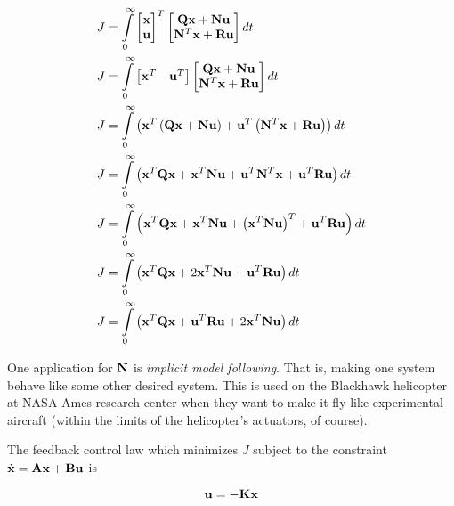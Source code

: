 \begin{align*}
  J &= \int\limits_0^\infty
    \begin{bmatrix}
      \mathbf{x} \\
      \mathbf{u}
    \end{bmatrix}^T
    \begin{bmatrix}
      \mathbf{Q}\mathbf{x} + \mathbf{N}\mathbf{u} \\
      \mathbf{N}^T\mathbf{x} + \mathbf{R}\mathbf{u}
    \end{bmatrix} dt \\
  J &= \int\limits_0^\infty
    \begin{bmatrix}
      \mathbf{x}^T & \mathbf{u}^T
    \end{bmatrix}
    \begin{bmatrix}
      \mathbf{Q}\mathbf{x} + \mathbf{N}\mathbf{u} \\
      \mathbf{N}^T\mathbf{x} + \mathbf{R}\mathbf{u}
    \end{bmatrix} dt \\
  J &= \int\limits_0^\infty
    \left(\mathbf{x}^T\left(\mathbf{Q}\mathbf{x} + \mathbf{N}\mathbf{u}\right) +
      \mathbf{u}^T\left(\mathbf{N}^T\mathbf{x} + \mathbf{R}\mathbf{u}\right)\right) dt \\
  J &= \int\limits_0^\infty
    \left(\mathbf{x}^T\mathbf{Q}\mathbf{x} + \mathbf{x}^T\mathbf{N}\mathbf{u} +
      \mathbf{u}^T\mathbf{N}^T\mathbf{x} + \mathbf{u}^T\mathbf{R}\mathbf{u}\right) dt \\
  J &= \int\limits_0^\infty
    \left(\mathbf{x}^T\mathbf{Q}\mathbf{x} + \mathbf{x}^T\mathbf{N}\mathbf{u} +
      \left(\mathbf{x}^T\mathbf{N}\mathbf{u}\right)^T + \mathbf{u}^T\mathbf{R}\mathbf{u}\right)
    dt \\
  J &= \int\limits_0^\infty
    \left(\mathbf{x}^T\mathbf{Q}\mathbf{x} + 2\mathbf{x}^T\mathbf{N}\mathbf{u} +
      \mathbf{u}^T\mathbf{R}\mathbf{u}\right) dt \\
  J &= \int\limits_0^\infty
    \left(\mathbf{x}^T\mathbf{Q}\mathbf{x} + \mathbf{u}^T\mathbf{R}\mathbf{u} +
      2\mathbf{x}^T\mathbf{N}\mathbf{u}\right) dt
\end{align*}

One application for $\mathbf{N}$ is \textit{implicit model following}. That is,
making one system behave like some other desired system. This is used on the
Blackhawk helicopter at NASA Ames research center when they want to make it fly
like experimental aircraft (within the limits of the helicopter's actuators, of
course).

The feedback \gls{control law} which minimizes $J$ subject to the constraint
$\dot{\mathbf{x}} = \mathbf{A}\mathbf{x} + \mathbf{B}\mathbf{u}$ is

\begin{equation*}
  \mathbf{u} = -\mathbf{K}\mathbf{x}
\end{equation*}


